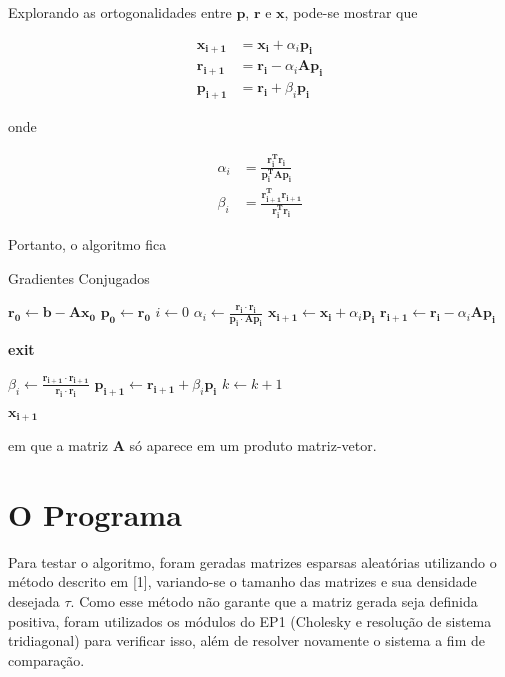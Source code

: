 \documentclass[a4paper,11pt]{article}
\begin{document}
    Explorando as ortogonalidades entre $\mathbf{p}$, $\mathbf{r}$ e $\mathbf{x}$, pode-se mostrar que

    \begin{align*}
        \mathbf{x_{i+1}} &= \mathbf{x_i} + \alpha_i\mathbf{p_i}  \\
        \mathbf{r_{i+1}} &= \mathbf{r_i} - \alpha_i\mathbf{Ap_i} \\
        \mathbf{p_{i+1}} &= \mathbf{r_i} + \beta_i\mathbf{p_i}
    \end{align*}

    onde

    \begin{align*}
        \alpha_i &= \mathbf{\frac{r_i^Tr_i}{p_i^TAp_i}} \\
        \beta_i  &= \mathbf{\frac{r_{i+1}^Tr_{i+1}}{r_i^Tr_i}}
    \end{align*}

    Portanto, o algoritmo fica
    \begin{algorithm}
        \caption{Gradientes Conjugados}
        \begin{algorithmic}[1]
            \State $\mathbf{r_0} \gets \mathbf{b - Ax_0}$
            \State $\mathbf{p_0} \gets \mathbf{r_0}$
            \State $i \gets 0$
            \Loop
                \State $\alpha_i \gets \frac{\mathbf{r_i}\cdot\mathbf{r_i}}{\mathbf{p_i\cdot Ap_i}}$
                \State $\mathbf{x_{i+1}} \gets \mathbf{x_i} + \alpha_i\mathbf{p_i}$
                \State $\mathbf{r_{i+1}} \gets \mathbf{r_i} - \alpha_i\mathbf{Ap_i}$


                    \textbf{exit}
                \EndIf

                \State $\beta_i \gets \frac{\mathbf{r_{i+1}}\cdot\mathbf{r_{i+1}}}{\mathbf{r_i}\cdot\mathbf{r_i}}$
                \State $\mathbf{p_{i+1}} \gets \mathbf{r_{i+1}} + \beta_i\mathbf{p_i}$
                \State $k \gets k + 1$
            \EndLoop

        \Return $\mathbf{x_{i+1}}$

        \end{algorithmic}
    \end{algorithm}

    em que a matriz $\mathbf{A}$ só aparece em um produto matriz-vetor.

    \section*{O Programa}
        Para testar o algoritmo, foram geradas matrizes esparsas aleatórias utilizando o método descrito em [1], variando-se o tamanho das matrizes
        e sua densidade desejada $\tau$.
        Como esse método não garante que a matriz gerada seja definida positiva, foram utilizados os módulos do EP1 (Cholesky e resolução de sistema tridiagonal)
        para verificar isso, além de resolver novamente o sistema a fim de comparação.
\end{document}
